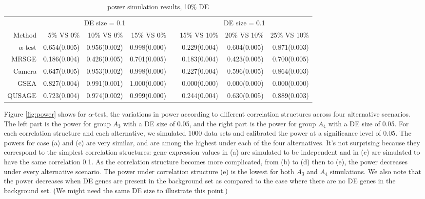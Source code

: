 \documentclass[useAMS,usenatbib, galley]{biom}
\newcommand{\OurMethod}{$\alpha$-test}
\newcommand{\aaCase}{a}
\newcommand{\aCase}{b}
\newcommand{\cCase}{c}
\newcommand{\eCase}{d}
\newcommand{\fCase}{e}
\begin{document}
	
	\begin{table*}
		\centering
		\caption{power simulation results, 10\% DE }\label{table:power}
		\begin{tabular}{rrrr c rrr}
			\hline\hline
			& \multicolumn{3}{c}{DE size = 0.1} &  & \multicolumn{3}{c}{DE size = 0.1} \\
			Method & 5\% VS 0\% & 10\% VS 0\% & 15\% VS 0\%	 & & 15\% VS 10\% & 20\% VS 10\% & 25\% VS 10\% \\ 
			\cline{2-4}   \cline{6-8}
			\OurMethod & 0.654(0.005) & 0.956(0.002) & 0.998(0.000) & & 0.229(0.004) & 0.604(0.005) & 0.871(0.003)\\ 
			MRSGE & 0.186(0.004) & 0.426(0.005) & 0.701(0.005)& & 0.183(0.004) & 0.423(0.005) & 0.700(0.005) \\ 
			Camera & 0.647(0.005) & 0.953(0.002) & 0.998(0.000)& & 0.227(0.004) & 0.596(0.005) & 0.864(0.003)  \\ 
			GSEA & 0.827(0.004) & 0.991(0.001) & 1.000(0.000) & & 0.000(0.000) & 0.000(0.000) & 0.000(0.000) \\ 
			QUSAGE & 0.723(0.004) & 0.974(0.002) & 0.999(0.000) & &  0.244(0.004) & 0.630(0.005) & 0.889(0.003) \\ 
			\hline\hline
		\end{tabular}
	\end{table*}
	
	
	
	Figure \ref{fig:power} shows for \OurMethod, the variations in power according to different correlation structures across four alternative scenarios. The left part is the power for group $A_3$ with a DE size of 0.05, and the right part is the power for group $A_4$ with a DE size of 0.05. For each correlation structure and each alternative, we simulated 1000 data sets and calibrated the power at a significance level of 0.05. 
	The powers for case (\aaCase) and (\cCase) are very similar, and are among the highest under each of the four alternatives. It's not surprising because they correspond to the simplest correlation structures: gene expression values in (\aaCase) are simulated to be independent and in (\cCase) are simulated to have the same correlation 0.1. As the correlation structure becomes more complicated, from (\aCase) to (\eCase) then to (\fCase), the power decreases under every alternative scenario. The power under correlation structure (\fCase) is the lowest for both $A_3$ and $A_4$ simulations. We also note that the power decreases when DE genes are present in the background set as compared to the case where there are no DE genes in the background set. (We might need the same DE size to illustrate this point.)
	
\end{document}
